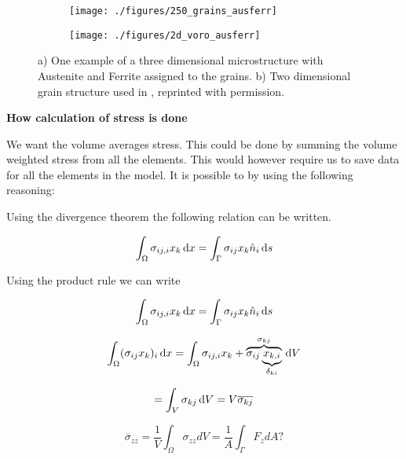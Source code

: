\documentclass[crystal_plast.tex]{subfiles}
\begin{document}
 \begin{figure}
\centering
\begin{subfigure}{.5\textwidth}
  \centering
  \texttt{[image: ./figures/250\_grains\_ausferr]}
  \caption{}
  \label{fig:ausferr_3d}
\end{subfigure}%
\begin{subfigure}{.6\textwidth}
  \centering
  \texttt{[image: ./figures/2d\_voro\_ausferr]}
  \caption{}
  \label{fig:ausferr_2d}
\end{subfigure}
\caption{a) One example of a three dimensional microstructure with Austenite and Ferrite assigned to the grains.  b) Two dimensional grain structure used in \cite{lillbacka2007multiscale}, reprinted with permission.}
\label{fig:ausferr}
\end{figure}




\textbf{How calculation of stress is done}

We want the volume averages stress. This could be done by summing the volume weighted stress from all the elements. This would however require us to save data for all the elements in the model. It is possible to by using the following reasoning:

Using the divergence theorem the following relation can be written.

\begin{equation}
\int_\Omega \sigma_{ij,i} x_k \, \mathrm{d} x = \int_\Gamma \sigma_{ij}  x_k \hat{n}_i \, \mathrm{d} s
\end{equation}

Using the product rule we can write

\begin{equation}
\int_\Omega \sigma_{ij,i} x_k \, \mathrm{d} x = \int_\Gamma \sigma_{ij}  x_k \hat{n}_i \, \mathrm{d} s
\end{equation}



\begin{equation}
\int_\Omega ( \sigma_{ij} x_k )_i \, \mathrm{d} x = \int_\Omega \sigma_{ij,i} x_k + \overbrace{\sigma_{ij} \underbrace{x_{k,i}}_{\delta_{ki}}}^{\sigma_{kj}} \, \mathrm{d} V 
\end{equation}

\begin{equation}
= \int_V \sigma_{kj} \, \mathrm{d} V = V \overline{\sigma_{kj}}
\end{equation}


\[ \overline{\sigma}_{zz} = \frac{1}{V} \int_\Omega \sigma_{zz} dV = \frac{1}{A} \int_\Gamma F_{z} dA? \]
\end{document}
